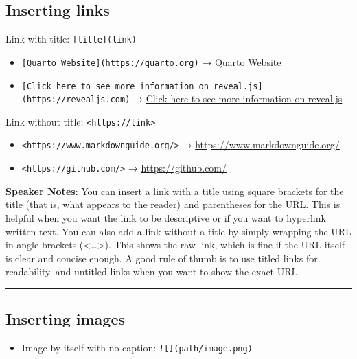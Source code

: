 \documentclass[
  letterpaper,
  DIV=11,
  numbers=noendperiod]{scrartcl}
\providecommand{\tightlist}{%
  \setlength{\itemsep}{0pt}\setlength{\parskip}{0pt}}
\begin{document}
\subsection{Inserting links}\label{inserting-links}

Link with title: \texttt{{[}title{]}(link)}

\begin{itemize}
\tightlist
\item
  \texttt{{[}Quarto\ Website{]}(https://quarto.org)} →
  \href{https://quarto.org/}{Quarto Website}
\item
  \texttt{{[}Click\ here\ to\ see\ more\ information\ on\ reveal.js{]}(https://revealjs.com)}
  → \href{https://revealjs.com/}{Click here to see more information on
  reveal.js}
\end{itemize}

Link without title: \texttt{\textless{}https://link\textgreater{}}

\begin{itemize}
\tightlist
\item
  \texttt{\textless{}https://www.markdownguide.org/\textgreater{}} →
  \url{https://www.markdownguide.org/}
\item
  \texttt{\textless{}https://github.com/\textgreater{}} →
  \url{https://github.com/}
\end{itemize}

\textbf{Speaker Notes}: You can insert a link with a title using square
brackets for the title (that is, what appears to the reader) and
parentheses for the URL. This is helpful when you want the link to be
descriptive or if you want to hyperlink written text. You can also add a
link without a title by simply wrapping the URL in angle brackets
(\textless\ldots\textgreater). This shows the raw link, which is fine if
the URL itself is clear and concise enough. A good rule of thumb is to
use titled links for readability, and untitled links when you want to
show the exact URL.

\begin{center}\rule{0.5\linewidth}{0.5pt}\end{center}

\subsection{Inserting images}\label{inserting-images}

\begin{itemize}
\tightlist
\item
  Image by itself with no caption: \texttt{!{[}{]}(path/image.png)}
\end{itemize}
\end{document}
